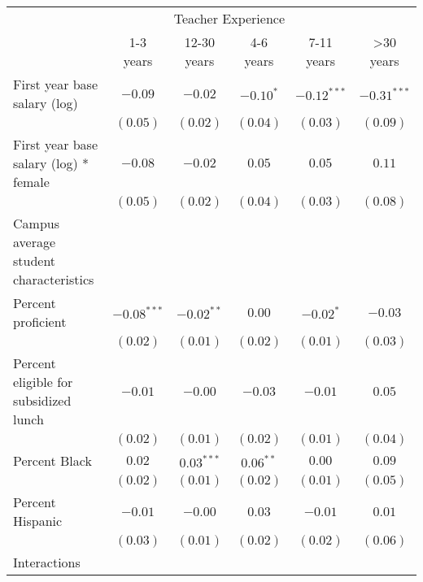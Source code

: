 \documentclass[]{article}
\begin{document}
\begin{table}
\begin{center}
\begin{tabular}{l c c c c c }
\hline
 & \multicolumn{4}{c}{Teacher Experience} \\ \cline{2-6}
 & 1-3 years & 12-30 years & 4-6 years & 7-11 years & >30 years \\
\hline
First year base salary (log)                & $-0.09$       & $-0.02$      & $-0.10^{*}$  & $-0.12^{***}$ & $-0.31^{***}$ \\
                                            & $(0.05)$      & $(0.02)$     & $(0.04)$     & $(0.03)$      & $(0.09)$      \\
First year base salary (log) * female       & $-0.08$       & $-0.02$      & $0.05$       & $0.05$        & $0.11$        \\
                                            & $(0.05)$      & $(0.02)$     & $(0.04)$     & $(0.03)$      & $(0.08)$      \\
Campus average student characteristics      &               &              &              &               &               \\
\quad Percent proficient                    & $-0.08^{***}$ & $-0.02^{**}$ & $0.00$       & $-0.02^{*}$   & $-0.03$       \\
                                            & $(0.02)$      & $(0.01)$     & $(0.02)$     & $(0.01)$      & $(0.03)$      \\
\quad Percent eligible for subsidized lunch & $-0.01$       & $-0.00$      & $-0.03$      & $-0.01$       & $0.05$        \\
                                            & $(0.02)$      & $(0.01)$     & $(0.02)$     & $(0.01)$      & $(0.04)$      \\
\quad Percent Black                         & $0.02$        & $0.03^{***}$ & $0.06^{**}$  & $0.00$        & $0.09$        \\
                                            & $(0.02)$      & $(0.01)$     & $(0.02)$     & $(0.01)$      & $(0.05)$      \\
\quad Percent Hispanic                      & $-0.01$       & $-0.00$      & $0.03$       & $-0.01$       & $0.01$        \\
                                            & $(0.03)$      & $(0.01)$     & $(0.02)$     & $(0.02)$      & $(0.06)$      \\
Interactions                                &               &              &              &               &               \\

\end{tabular}
\end{center}
\end{table}
\end{document}
